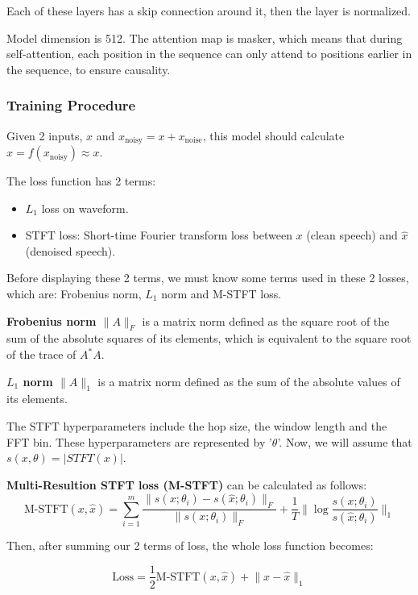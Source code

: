 Each of these layers has a skip connection around it, then the layer is normalized.

Model dimension is 512. The attention map is masker, which means that during self-attention, each position in the sequence can only attend to positions earlier in the sequence, to ensure causality.

\subsubsection{Training Procedure}
Given 2 inputs, $x$ and $x_{\text{noisy}} = x + x_{\text{noise}}$, this model should calculate $\hat{x} = f(x_{\text{noisy}}) \approx x$.

The loss function has 2 terms:
\begin{itemize}
    \item $L_1$ loss on waveform.
    \item STFT loss: Short-time Fourier transform loss between $x$ (clean speech) and $\hat{x}$ (denoised speech).
\end{itemize}

Before displaying these 2 terms, we must know some terms used in these 2 losses, which are: Frobenius norm, $L_1$ norm and M-STFT loss.

\textbf{Frobenius norm $\lVert A \rVert_F$} is a matrix norm defined as the square root of the sum of the absolute squares of its elements, which is equivalent to the square root of the trace of $A^*A$.

\textbf{$L_1$ norm $\lVert A \rVert_1$} is a matrix norm defined as the sum of the absolute values of its elements.

The STFT hyperparameters include the hop size, the window length and the FFT bin. These hyperparameters are represented by '$\theta$'. Now, we will assume that $s(x,\theta) = \vert STFT(x) \vert$.

\textbf{Multi-Resultion STFT loss (M-STFT)} can be calculated as follows:
\begin{equation}
    \text{M-STFT}(x,\hat{x}) = \sum_{i = 1}^{m} \frac{\lVert s(x;\theta_i) - s(\hat{x};\theta_i) \rVert_F}{\lVert s(x;\theta_i) \rVert_F} + \frac{1}{T} \lVert \log{\frac{s(x;\theta_i)}{s(\hat{x};\theta_i)}} \rVert_1 
\end{equation} 

Then, after summing our 2 terms of loss, the whole loss function becomes:

\begin{equation}
    \text{Loss} = \frac{1}{2} \text{M-STFT}(x,\hat{x}) + \lVert x - \hat{x} \rVert_1
\end{equation}

